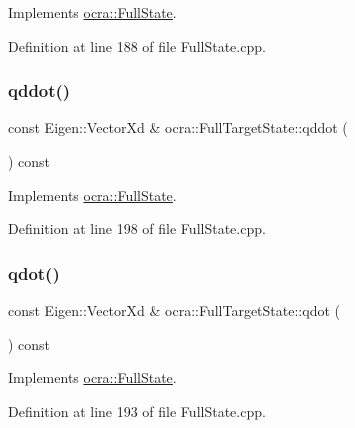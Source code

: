 Implements \hyperlink{classocra_1_1FullState_a3bb03b513d7cb3a5447d1d4eb2d643b0}{ocra\+::\+Full\+State}.



Definition at line 188 of file Full\+State.\+cpp.

\hypertarget{classocra_1_1FullTargetState_a1436b42b01d2857e4dc5c53a233f0e69}{}\label{classocra_1_1FullTargetState_a1436b42b01d2857e4dc5c53a233f0e69} 
\subsubsection{\texorpdfstring{qddot()}{qddot()}}
{\footnotesize\ttfamily const Eigen\+::\+Vector\+Xd \& ocra\+::\+Full\+Target\+State\+::qddot (\begin{DoxyParamCaption}{ }\end{DoxyParamCaption}) const\hspace{0.3cm}{\ttfamily [virtual]}}



Implements \hyperlink{classocra_1_1FullState_a5882a53273cd9d3baae36b5850deadae}{ocra\+::\+Full\+State}.



Definition at line 198 of file Full\+State.\+cpp.

\hypertarget{classocra_1_1FullTargetState_a2ada581270803a39e8c690f8c9354644}{}\label{classocra_1_1FullTargetState_a2ada581270803a39e8c690f8c9354644} 
\subsubsection{\texorpdfstring{qdot()}{qdot()}}
{\footnotesize\ttfamily const Eigen\+::\+Vector\+Xd \& ocra\+::\+Full\+Target\+State\+::qdot (\begin{DoxyParamCaption}{ }\end{DoxyParamCaption}) const\hspace{0.3cm}{\ttfamily [virtual]}}



Implements \hyperlink{classocra_1_1FullState_a7018fe03dc3c8b3ec95d3c2015ae60e6}{ocra\+::\+Full\+State}.



Definition at line 193 of file Full\+State.\+cpp.

